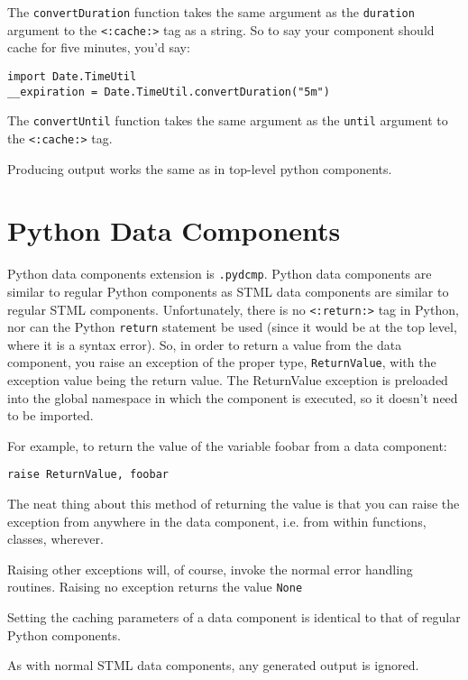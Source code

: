 \documentclass{manual}
\begin{document}
The \texttt{convertDuration} function takes the same argument as the
\texttt{duration} argument to the \texttt{<:cache:>} tag as a string.  So
to say your component should cache for five minutes, you'd say:

\begin{verbatim}
import Date.TimeUtil
__expiration = Date.TimeUtil.convertDuration("5m")
\end{verbatim}


The \texttt{convertUntil} function takes the same argument as the
\texttt{until} argument to the \texttt{<:cache:>} tag.

Producing output works the same as in top-level python components.



\section{Python Data Components}
\label{pythondata}
Python data components extension is \texttt{.pydcmp}.  Python data
components are similar to regular Python components as STML data
components are similar to regular STML components.  Unfortunately,
there is no \texttt{<:return:>} tag in Python, nor can the Python
\texttt{return} statement be used (since it would be at the top
level, where it is a syntax error).  So, in order to return a value
from the data component, you 
raise an exception of the proper type, \texttt{ReturnValue}, with the
exception value being the return value.  The ReturnValue exception is
preloaded into the global namespace in which the component is
executed, so it doesn't need to be imported.

For example, to return the value of the variable foobar from a data
component:
\begin{verbatim}
raise ReturnValue, foobar
\end{verbatim}


The neat thing about this method of returning the value is that you
can raise the exception from anywhere in the data component, i.e. from
within functions, classes, wherever.

Raising other exceptions will, of course, invoke the normal error
handling routines.  Raising no exception returns the value \texttt{None}

Setting the caching parameters of a data component is identical to that of
regular Python components.

As with normal STML data components, any generated output is ignored.
\end{document}
